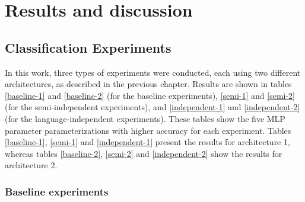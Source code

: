 
\chapter{Results and discussion}
\label{ch:omnisvoluptas}




\section{Classification Experiments}

In this work, three types of experiments were conducted, each using two different architectures, as described in the previous chapter. Results are shown in tables \ref{baseline-1} and \ref{baseline-2} (for the baseline experiments), \ref{semi-1} and \ref{semi-2} (for the semi-independent experiments), and \ref{independent-1} and \ref{independent-2} (for the language-independent experiments). These tables show the five MLP parameter parameterizations with higher accuracy for each experiment. Tables \ref{baseline-1}, \ref{semi-1} and \ref{independent-1} present the results for architecture 1, whereas tables \ref{baseline-2}, \ref{semi-2} and \ref{independent-2} show the results for architecture 2.

\subsection{Baseline experiments}

